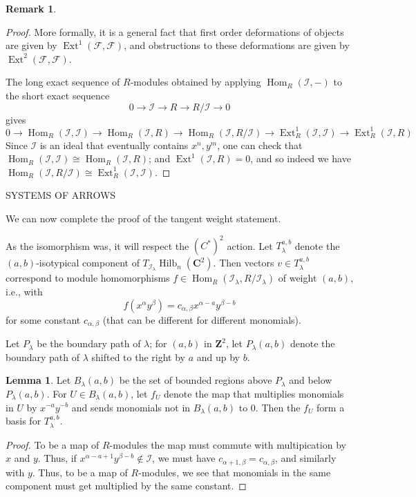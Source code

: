 \documentclass{amsart}[12pt]
\theoremstyle{definition}
\newtheorem{lemma}[dummy]{Lemma}
\newtheorem{remark}[dummy]{Remark}
\newcommand{\Z}{\mathbf{Z}}
\newcommand{\C}{\mathbf{C}}
\newcommand{\II}{\mathcal{I}}
\DeclareMathOperator{\Hilb}{Hilb}
\DeclareMathOperator{\Ext}{Ext}
\DeclareMathOperator{\Hom}{Hom}
\begin{document}
\begin{remark}
\begin{proof}
More formally, it is a general fact that first order deformations of objects are given by $\Ext^1(\mathcal{F},\mathcal{F})$, and obstructions to these deformations are given by $\Ext^2(\mathcal{F},\mathcal{F})$. 

The long exact sequence of $R$-modules obtained by applying $\Hom_R(\II, -)$ to the short exact sequence
$$0\to \II\to R\to R/\II\to 0$$
gives 
$$0\to\Hom_R(\II,\II)\to \Hom_R(\II, R)\to\Hom_R(\II,R/\II)\to\Ext_R^1(\II, \II)\to\Ext_R^1(\II,R)$$
Since $\II$ is an ideal that eventually contains $x^n, y^m$, one can check that  $\Hom_R(\II,\II)\cong\Hom_R(\II, R)$;  and $\Ext^1(\II,R)=0$, and so indeed we have $\Hom_R(\II,R/\II)\cong\Ext_R^1(\II, \II)$.
\end{proof}


SYSTEMS OF ARROWS

We can now complete the proof of the tangent weight statement.

As the isomorphism was, it will respect the $(C^*)^2$ action.  Let $T_\lambda^{a,b}$ denote the $(a,b)$-isotypical component of $T_{\II_\lambda}\Hilb_n(\C^2)$.  Then vectors $v\in T_\lambda^{a,b}$ correspond to module homomorphisms $f\in\Hom_R(\II_\lambda, R/\II_\lambda)$ of weight $(a,b)$, i.e., with
$$f(x^{\alpha}y^\beta)=c_{\alpha,\beta} x^{\alpha-a}y^{\beta-b}$$
for some constant $c_{\alpha, \beta}$ (that can be different for different monomials).  


Let $P_\lambda$ be the boundary path of $\lambda$; for $(a,b)$ in $\Z^2$, let $P_\lambda(a,b)$ denote the boundary path of $\lambda$ shifted to the right by $a$ and up by $b$.

\begin{lemma} Let $B_\lambda(a,b)$ be the set of bounded regions above $P_\lambda$ and below $P_\lambda(a,b)$.  For $U\in B_\lambda(a,b)$, let $f_U$ denote the map that multiplies monomials in $U$ by $x^{-a}y^{-b}$ and sends monomials not in $B_\lambda(a,b)$ to $0$.  Then the $f_U$ form a basis for $T_\lambda^{a,b}$.
\end{lemma}

\begin{proof}
To be a map of $R$-modules the map must commute with multipication by $x$ and $y$.  Thus, if $x^{\alpha-a+1}y^{\beta-b}\notin \II$, we must have $c_{\alpha+1,\beta}=c_{\alpha,\beta}$, and similarly with $y$.  Thus, to be a map of $R$-modules, we see that monomials in the same component must get multiplied by the same constant.


\end{proof}
\end{remark}
\end{document}
